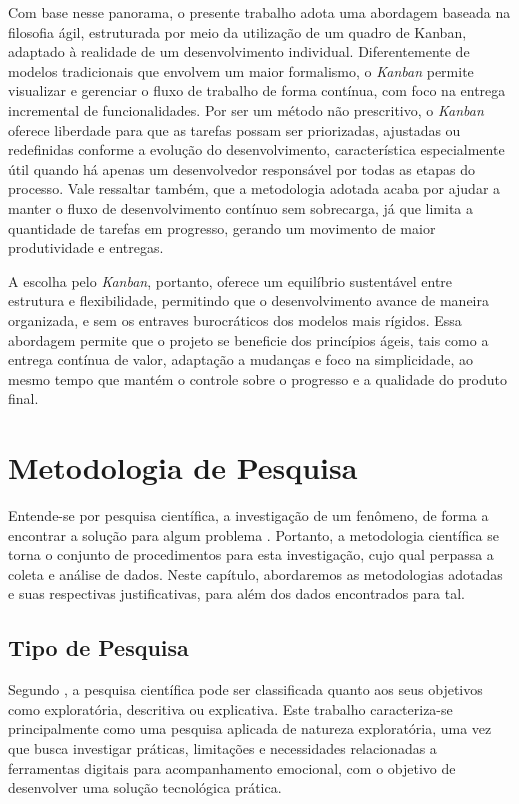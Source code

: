Com base nesse panorama, o presente trabalho adota uma abordagem baseada na
filosofia ágil, estruturada por meio da utilização de um quadro de Kanban,
adaptado à realidade de um desenvolvimento individual. Diferentemente de
modelos tradicionais que envolvem um maior formalismo, o \textit{Kanban}
permite visualizar e gerenciar o fluxo de trabalho de forma contínua, com foco
na entrega incremental de funcionalidades. Por ser um método não prescritivo, o
\textit{Kanban} oferece liberdade para que as tarefas possam ser priorizadas,
ajustadas ou redefinidas conforme a evolução do desenvolvimento, característica
especialmente útil quando há apenas um desenvolvedor responsável por todas as
etapas do processo. Vale ressaltar também, que a metodologia adotada acaba por
ajudar a manter o fluxo de desenvolvimento contínuo sem sobrecarga, já que
limita a quantidade de tarefas em progresso, gerando um movimento de maior
produtividade e entregas.

A escolha pelo \textit{Kanban}, portanto, oferece um equilíbrio sustentável
entre estrutura e flexibilidade, permitindo que o desenvolvimento avance de
maneira organizada, e sem os entraves burocráticos dos modelos mais rígidos.
Essa abordagem permite que o projeto se beneficie dos princípios ágeis, tais
como a entrega contínua de valor, adaptação a mudanças e foco na simplicidade,
ao mesmo tempo que mantém o controle sobre o progresso e a qualidade do produto
final.

\section{Metodologia de Pesquisa}

Entende-se por pesquisa científica, a investigação de um fenômeno, de forma a
encontrar a solução para algum problema \cite{Coelho:2020}. Portanto, a
metodologia científica se torna o conjunto de procedimentos para esta
investigação, cujo qual perpassa a coleta e análise de dados. Neste capítulo,
abordaremos as metodologias adotadas e suas respectivas justificativas, para
além dos dados encontrados para tal.

\subsection{Tipo de Pesquisa}

Segundo \cite{Lakatos:2022}, a pesquisa científica pode ser classificada
quanto aos seus objetivos como exploratória, descritiva ou explicativa. Este
trabalho caracteriza-se principalmente como uma pesquisa aplicada de natureza
exploratória, uma vez que busca investigar práticas, limitações e necessidades
relacionadas a ferramentas digitais para acompanhamento emocional, com o
objetivo de desenvolver uma solução tecnológica prática.

